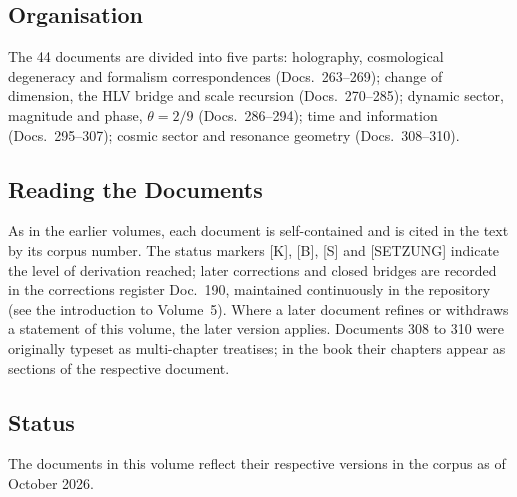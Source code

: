 \subsection*{Organisation}

The 44 documents are divided into five parts: holography, cosmological
degeneracy and formalism correspondences (Docs.~263--269); change of
dimension, the HLV bridge and scale recursion (Docs.~270--285); dynamic
sector, magnitude and phase, $\theta=2/9$ (Docs.~286--294); time and
information (Docs.~295--307); cosmic sector and resonance geometry
(Docs.~308--310).

\subsection*{Reading the Documents}

As in the earlier volumes, each document is self-contained and is cited in
the text by its corpus number. The status markers [K], [B], [S] and
[SETZUNG] indicate the level of derivation reached; later corrections and
closed bridges are recorded in the corrections register Doc.~190, maintained
continuously in the repository (see the introduction to Volume~5). Where a later document refines or withdraws a statement of this
volume, the later version applies. Documents 308 to 310 were originally
typeset as multi-chapter treatises; in the book their chapters appear as
sections of the respective document.

\subsection*{Status}

The documents in this volume reflect their respective versions in the corpus
as of October 2026.

